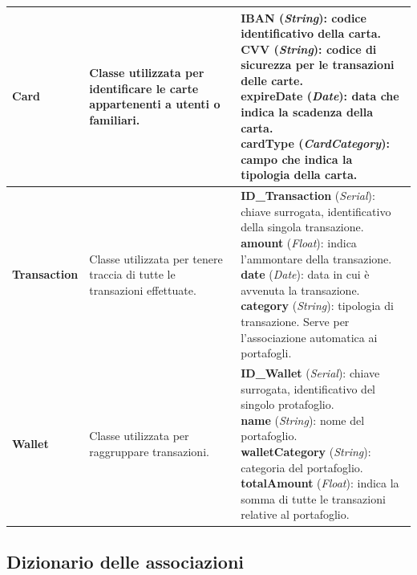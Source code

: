 \begin{longtable}{m{2.5cm}|m{4cm}|m{7.2cm}}
    \textbf{Card} & \raggedright Classe utilizzata per identificare le carte appartenenti a utenti o familiari. &
    \parbox{7.2cm}{
        \textbf{IBAN} (\textit{String}): codice identificativo della carta. \\
        \textbf{CVV} (\textit{String}): codice di sicurezza per le transazioni delle carte. \\
        \textbf{expireDate} (\textit{Date}): data che indica la scadenza della carta. \\
        \textbf{cardType} (\textit{CardCategory}): campo che indica la tipologia della carta.
    } \\ \hline

    \textbf{Transaction} & \raggedright Classe utilizzata per tenere traccia di tutte le transazioni effettuate. &
    \parbox{7.2cm}{
        \textbf{ID\_Transaction} (\textit{Serial}): chiave surrogata, identificativo della singola transazione. \\
        \textbf{amount} (\textit{Float}): indica l'ammontare della transazione. \\
        \textbf{date} (\textit{Date}): data in cui è avvenuta la transazione. \\
        \textbf{category} (\textit{String}): tipologia di transazione. Serve per l'associazione automatica ai portafogli.
    } \\ \hline

    \textbf{Wallet} & \raggedright Classe utilizzata per raggruppare transazioni. &
    \parbox{7.2cm}{
        \textbf{ID\_Wallet} (\textit{Serial}): chiave surrogata, identificativo del singolo protafoglio. \\
        \textbf{name} (\textit{String}): nome del portafoglio. \\
        \textbf{walletCategory} (\textit{String}): categoria del portafoglio. \\
        \textbf{totalAmount} (\textit{Float}): indica la somma di tutte le transazioni relative al portafoglio.
    } \\ \hline

\end{longtable}

\subsection{Dizionario delle associazioni}

